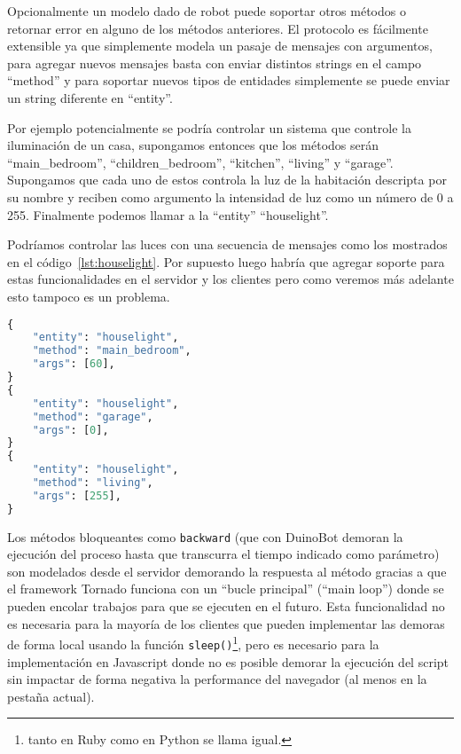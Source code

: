 Opcionalmente un modelo dado de robot puede soportar otros métodos o retornar
error en alguno de los métodos anteriores. El protocolo es fácilmente
extensible ya que simplemente modela un pasaje de mensajes con argumentos,
para agregar nuevos mensajes basta con enviar distintos strings en el
campo ``method'' y para soportar nuevos tipos de entidades simplemente
se puede enviar un string diferente en ``entity''.

Por ejemplo potencialmente
se podría controlar un sistema que controle la iluminación de un casa,
supongamos entonces que los métodos serán ``main\_bedroom'', ``children\_bedroom'',
``kitchen'', ``living'' y ``garage''. Supongamos que cada uno de estos
controla la luz de la habitación descripta por su nombre y reciben como
argumento la intensidad de luz como un número de 0 a 255. Finalmente
podemos llamar a la ``entity'' ``houselight''.

Podríamos controlar las luces con una secuencia de mensajes como
los mostrados en el código~\ref{lst:houselight}. Por supuesto luego
habría que agregar soporte para estas funcionalidades en el servidor
y los clientes pero como veremos más adelante esto tampoco es
un problema.

\begin{lstlisting}[language=python,
caption={Ejemplo de una posible extensión al protocolo para controlar
las luces de una casa},
label=lst:houselight]
{
    "entity": "houselight",
    "method": "main_bedroom",
    "args": [60],
}
{
    "entity": "houselight",
    "method": "garage",
    "args": [0],
}
{
    "entity": "houselight",
    "method": "living",
    "args": [255],
}
\end{lstlisting}


Los métodos bloqueantes como \texttt{backward} (que con DuinoBot demoran
la ejecución del proceso hasta que transcurra el tiempo indicado como
parámetro) son modelados desde el servidor demorando la respuesta al método
gracias a que el framework Tornado funciona con un ``bucle principal''
(``main loop'') donde se pueden encolar trabajos para que se ejecuten
en el futuro.
Esta funcionalidad no es necesaria para la mayoría de los clientes que
pueden implementar las demoras de forma local usando la función
\texttt{sleep()}\footnote{tanto en Ruby como en Python se llama igual.},
pero es necesario para la implementación en Javascript donde no es posible
demorar la ejecución del script sin impactar de forma negativa la performance
del navegador (al menos en la pestaña actual).



